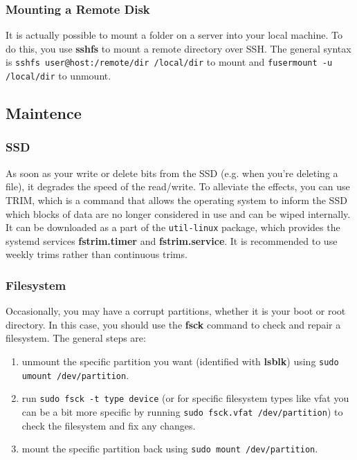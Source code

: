 \documentclass{article}
\begin{document}
    \subsubsection{Mounting a Remote Disk} 

      It is actually possible to mount a folder on a server into your local machine. To do this, you use \textbf{sshfs} to mount a remote directory over SSH. The general syntax is \texttt{sshfs user@host:/remote/dir /local/dir} to mount and \texttt{fusermount -u /local/dir} to unmount. 

  \subsection{Maintence} 

    \subsubsection{SSD}

      As soon as your write or delete bits from the SSD (e.g. when you're deleting a file), it degrades the speed of the read/write. To alleviate the effects, you can use TRIM, which is a command that allows the operating system to inform the SSD which blocks of data are no longer considered in use and can be wiped internally. It can be downloaded as a part of the \texttt{util-linux} package, which provides the systemd services \textbf{fstrim.timer} and \textbf{fstrim.service}. It is recommended to use weekly trims rather than continuous trims. 

    \subsubsection{Filesystem} 

      Occasionally, you may have a corrupt partitions, whether it is your boot or root directory. In this case, you should use the \textbf{fsck} command to check and repair a filesystem. The general steps are: 
      \begin{enumerate} 
        \item unmount the specific partition you want (identified with \textbf{lsblk}) using \texttt{sudo umount /dev/partition}. 
        \item run \texttt{sudo fsck -t type device} (or for specific filesystem types like vfat you can be a bit more specific by running \texttt{sudo fsck.vfat /dev/partition}) to check the filesystem and fix any changes. 
        \item mount the specific partition back using \texttt{sudo mount /dev/partition}. 
      \end{enumerate}
\end{document}
